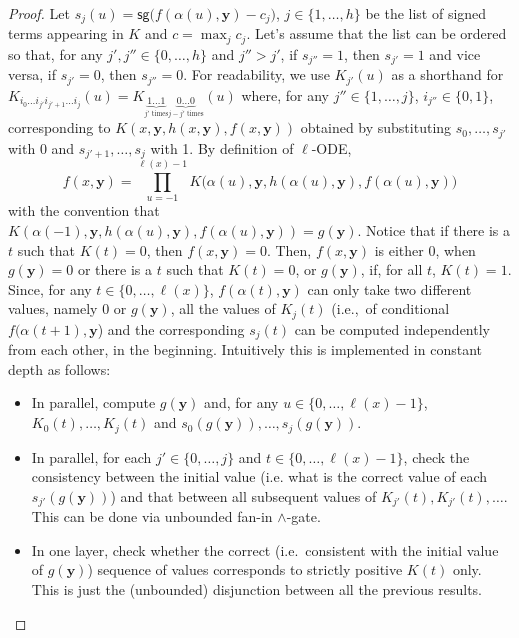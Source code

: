 \documentclass[11pt, oneside]{article}
\newenvironment{toappendix}{}{}
\newcommand{\fun}[1]{\mathsf{#1}}
\newcommand{\tu}[1]{\mathbf{#1}}
\theoremstyle{definition}
\begin{document}
\begin{toappendix}
\begin{proof}
    Let $s_j(u)= \fun{sg}\big(f(\alpha(u), \tu y)-c_j\big)$, $j\in \{1,\dots, h\}$ be the list of signed terms appearing in $K$ and $c=\max_j c_j$.
    Let's assume that the list can be ordered so that, for any $j', j''\in \{0,\dots,h\}$ and $j''>j'$, if $s_{j''}=1$, then $s_{j'}=1$ and vice versa, if $s_{j'}=0$, then $s_{j''}=0$.
    For readability, we use $K_{j'}(u)$ as a shorthand for $K_{i_0\dots i_{j'} i_{j'+1}\dots i_j}(u)= K_{\underbrace{1\dots 1}_{j' \text{ times}}\underbrace{0\dots 0}_{j-j' \text{ times}}}(u)$ where, for any $j''\in \{1,\dots, j\}$, $i_{j''}\in \{0,1\}$, corresponding to $K(x, \tu y, h(x, \tu y), f(x, \tu y))$ obtained by substituting $s_0, \dots, s_{j'}$ with 0 and $s_{j'+1},\dots, s_{j}$ with 1.
    By definition of $\ell$-ODE,
    $$
    f(x, \tu y) = \prod^{\ell(x)-1}_{u=-1} K\big(\alpha (u), \tu y, h(\alpha(u), \tu y), f(\alpha(u), \tu y)\big)
    $$
    with the convention that $K(\alpha(-1), \tu y, h(\alpha(u), \tu y), f(\alpha(u), \tu y))=g(\tu y)$.
    Notice that if there is a $t$ such that $K(t)= 0$, then $f(x, \tu y)=0$.
    Then, $f(x, \tu y)$ is either 0, when $g(\tu y)=0$ or there is a $t$ such that $K(t)=0$,
    or $g(\tu y)$, if, for all $t$, $K(t)=1$.
    Since, for any $t\in \{0,\dots, \ell(x)\}$, $f(\alpha(t),\tu y)$ can only take two different values, namely 0 or $g(\tu y)$, all the values of $K_j(t)$ (i.e.,~of conditional $f(\alpha(t+1), \tu y$) and the corresponding $s_j(t)$ can be computed independently from each other, in the beginning.
    Intuitively this is implemented in constant depth as follows:
    \begin{itemize}
    \itemsep0em
        \item In parallel, compute $g(\tu y)$ and, for any $u\in \{0,\dots, \ell(x)-1\}$, $K_{0}(t), \dots, K_{j}(t)$ and $s_0(g(\tu y)), \dots, s_j(g(\tu y))$.
        \item In parallel, for each $j'\in \{0,\dots, j\}$ and $t\in \{0,\dots, \ell(x)-1\}$, check the consistency between the initial value (i.e. what is the correct value of each $s_{j'}(g(\tu y))$) and that between all subsequent values of $K_{j'}(t), K_{j'}(t), \dots$.
        This can be done via unbounded fan-in $\wedge$-gate.
        \item In one layer, check whether the correct (i.e.~consistent with the initial value of $g(\tu y)$) sequence of values corresponds to strictly positive $K(t)$ only. This is just the (unbounded) disjunction between all the previous results.

\end{itemize}
\end{proof}
\end{toappendix}
\end{document}
